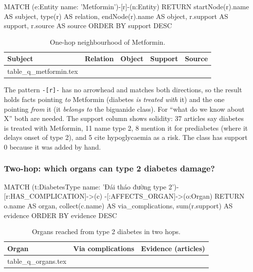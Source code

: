 \documentclass[11pt, a4paper]{article}
\makeatletter
\newcommand{\tabinput}[1]{\@@input #1 }   %
\newcommand{\code}[1]{\texttt{#1}}
\makeatother
\begin{document}
\begin{codeblock}
MATCH (e:Entity {name: 'Metformin'})-[r]-(n:Entity)
RETURN startNode(r).name AS subject, type(r) AS relation, endNode(r).name AS object,
       r.support AS support, r.source AS source
ORDER BY support DESC
\end{codeblock}

\begin{table}[H]
\centering
\small
\caption{One-hop neighbourhood of Metformin.}
\label{tab:q-metformin}
\begin{tabular}{l l l r l}
\toprule
Subject & Relation & Object & Support & Source \\
\midrule
\tabinput{table_q_metformin.tex}
\bottomrule
\end{tabular}
\end{table}

The pattern \code{-[r]-} has no arrowhead and matches both directions, so the result holds facts pointing \emph{to} Metformin (diabetes \emph{is treated with} it) and the one pointing \emph{from} it (it \emph{belongs to} the biguanide class). For ``what do we know about X'' both are needed. The support column shows solidity: 37 articles say diabetes is treated with Metformin, 11 name type 2, 8 mention it for prediabetes (where it delays onset of type 2), and 5 cite hypoglycaemia as a risk. The class has support 0 because it was added by hand.

\subsubsection{Two-hop: which organs can type 2 diabetes damage?}

\begin{codeblock}
MATCH (t:DiabetesType {name: 'Đái tháo đường type 2'})-[r:HAS_COMPLICATION]->(c)
      -[:AFFECTS_ORGAN]->(o:Organ)
RETURN o.name AS organ, collect(c.name) AS via_complications, sum(r.support) AS evidence
ORDER BY evidence DESC
\end{codeblock}

\begin{table}[H]
\centering
\small
\caption{Organs reached from type 2 diabetes in two hops.}
\label{tab:q-organs}
\begin{tabularx}{\textwidth}{l X r}
\toprule
Organ & Via complications & Evidence (articles) \\
\midrule
\tabinput{table_q_organs.tex}
\bottomrule
\end{tabularx}
\end{table}
\end{document}
